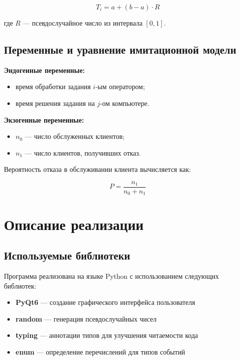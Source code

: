 \begin{equation}
T_i = a + (b - a) \cdot R
\end{equation}

где $R$ — псевдослучайное число из интервала $[0, 1]$.

\subsection{Переменные и уравнение имитационной модели}

\textbf{Эндогенные переменные:}

\begin{itemize}
    \item время обработки задания $i$-ым оператором;
    \item время решения задания на $j$-ом компьютере.
\end{itemize}

\textbf{Экзогенные переменные:}

\begin{itemize}
    \item $n_0$ — число обслуженных клиентов;
    \item $n_1$ — число клиентов, получивших отказ.
\end{itemize}

Вероятность отказа в обслуживании клиента вычисляется как:

\begin{equation}
P = \frac{n_1}{n_0 + n_1}
\end{equation}

\section{Описание реализации}

\subsection{Используемые библиотеки}

Программа реализована на языке Python с использованием следующих библиотек:

\begin{itemize}
    \item \textbf{PyQt6} — создание графического интерфейса пользователя
    \item \textbf{random} — генерация псевдослучайных чисел
    \item \textbf{typing} — аннотации типов для улучшения читаемости кода
    \item \textbf{enum} — определение перечислений для типов событий
\end{itemize}

